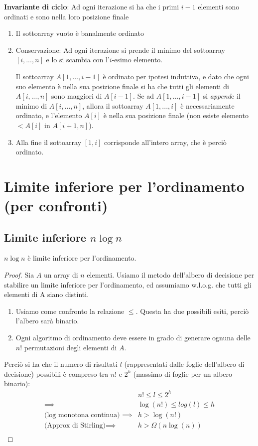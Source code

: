 \documentclass[a4paper,10pt]{article}
\theoremstyle{definition}
\begin{document}
\textbf{Invariante di ciclo}: Ad ogni iterazione si ha che i primi $i-1$ elementi sono ordinati e sono nella loro posizione finale
\begin{enumerate}
\item Il sottoarray vuoto è banalmente ordinato
 \item Conservazione: Ad ogni iterazione si prende il minimo del sottoarray $[i, ... , n]$ e lo si scambia con l'$i$-esimo elemento. 
 
 Il sottoarray $A[1, ..., i-1]$ è ordinato per ipotesi induttiva, e dato che ogni suo elemento è nella sua posizione finale si ha che tutti gli elementi di $A[i, ... , n]$ sono maggiori di $A[i-1]$. Se ad $A[1, ..., i-1]$ si \emph{append}e il minimo di $A[i, ... , n]$, allora il sottoarray $A[1, ..., i]$ è necessariamente ordinato, e l'elemento $A[i]$ è nella sua posizione finale (non esiste elemento $< A[i]$ in $A[i+1, n]$).
 \item Alla fine il sottoarray $[1, i]$ corrisponde all'intero array, che è perciò ordinato.
\end{enumerate}
\section{Limite inferiore per l'ordinamento (per confronti)}
\subsection{Limite inferiore $n \log n$}
$n\log n$ è limite inferiore per l'ordinamento.
\begin{proof}
Sia $A$ un array di $n$ elementi. Usiamo il metodo dell'albero di decisione per stabilire un limite inferiore per l'ordinamento, ed assumiamo w.l.o.g. che tutti gli elementi di A siano distinti.

\begin{enumerate}
 \item Usiamo come confronto la relazione $\leq$. Questa ha due possibili esiti, perciò l'albero sarà binario. 
 \item Ogni algoritmo di ordinamento deve essere in grado di generare ognuna delle $n!$ permutazioni degli elementi di $A$. 
\end{enumerate}
Perciò si ha che il numero di risultati $l$ (rappresentati dalle foglie dell'albero di decisione) possibili è compreso tra $n!$ e $2^h$ (massimo di foglie per un albero binario): 
\[\begin{aligned}
&n! \leq l \leq  2^h   \\
\implies & \log(n!) \leq log(l) \leq h\\
\text{(log monotona continua) }\implies& h > \log(n!)\\ 
\text{(Approx di Stirling)}\implies& h > \Omega(n\log(n))\\ 
\end{aligned}
\]

\end{proof}
\end{document}
